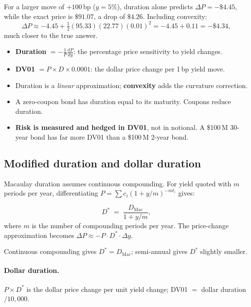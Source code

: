 For a larger move of $+100$\,bp ($y = 5\%$), duration alone predicts
$\Delta P = -\$4.45$, while the exact price is $\$91.07$, a drop of
$\$4.26$.  Including convexity:
\[
  \Delta P \approx -4.45 + \tfrac{1}{2}(95.33)(22.77)(0.01)^2
  = -4.45 + 0.11 = -\$4.34,
\]
much closer to the true answer.

\begin{keyfactbox}
\begin{itemize}
  \item \textbf{Duration} $= -\frac{1}{P}\frac{dP}{dy}$: the
    percentage price sensitivity to yield changes.
  \item \textbf{DV01} $= P \times D \times 0.0001$: the dollar
    price change per 1\,bp yield move.
  \item Duration is a \emph{linear} approximation; \textbf{convexity}
    adds the curvature correction.
  \item A zero-coupon bond has duration equal to its maturity.
    Coupons reduce duration.
  \item \textbf{Risk is measured and hedged in DV01}, not in notional.
    A \$100\,M 30-year bond has far more DV01 than a \$100\,M 2-year
    bond.
\end{itemize}
\end{keyfactbox}

\subsection{Modified duration and dollar duration}
\label{sec:fi_modified_duration}

Macaulay duration assumes continuous compounding.  For yield quoted
with $m$ periods per year, differentiating
$P = \sum c_i (1 + y/m)^{-m t_i}$ gives:

\begin{definition}
\begin{equation}
  D^* \;=\; \frac{D_{\text{Mac}}}{1 + y/m},
  \label{eq:modified_duration}
\end{equation}
where $m$ is the number of compounding periods per year.
The price-change approximation becomes $\Delta P \approx -P \cdot D^*
\cdot \Delta y$.
\end{definition}

Continuous compounding gives $D^* = D_{\text{Mac}}$; semi-annual
gives $D^*$ slightly smaller.

\paragraph{Dollar duration.}
$P \times D^*$ is the dollar price change per unit yield change;
DV01 $= $ dollar duration $/ 10{,}000$.

